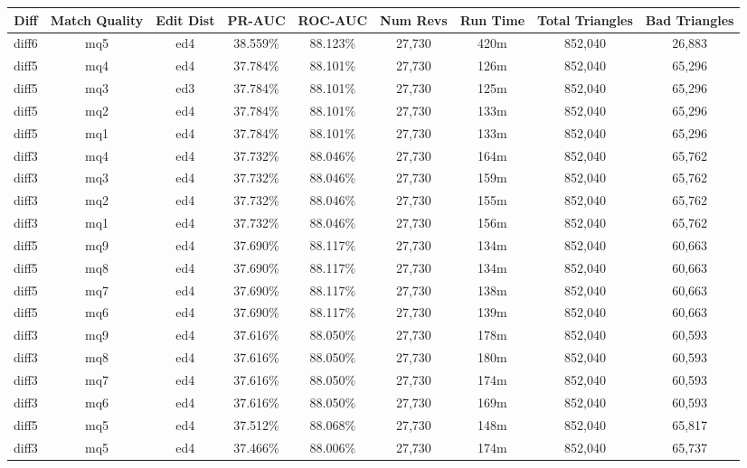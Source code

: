 \begin{sidewaystable}[!ph]
  \begin{center}
    \begin{tabular}{|c|c|c||c|c||c|c|c|c|}
\hline
Diff & Match Quality & Edit Dist
        & PR-AUC & ROC-AUC
        & Num Revs & Run Time
        & Total Triangles & Bad Triangles \\
\hline
\hline
diff6 & mq5 & ed4 & 38.559\% & 88.123\% & 27,730 & 420m & 852,040 & 26,883 \\
diff5 & mq4 & ed4 & 37.784\% & 88.101\% & 27,730 & 126m & 852,040 & 65,296 \\
diff5 & mq3 & ed3 & 37.784\% & 88.101\% & 27,730 & 125m & 852,040 & 65,296 \\
diff5 & mq2 & ed4 & 37.784\% & 88.101\% & 27,730 & 133m & 852,040 & 65,296 \\
diff5 & mq1 & ed4 & 37.784\% & 88.101\% & 27,730 & 133m & 852,040 & 65,296 \\
diff3 & mq4 & ed4 & 37.732\% & 88.046\% & 27,730 & 164m & 852,040 & 65,762 \\
diff3 & mq3 & ed4 & 37.732\% & 88.046\% & 27,730 & 159m & 852,040 & 65,762 \\
diff3 & mq2 & ed4 & 37.732\% & 88.046\% & 27,730 & 155m & 852,040 & 65,762 \\
diff3 & mq1 & ed4 & 37.732\% & 88.046\% & 27,730 & 156m & 852,040 & 65,762 \\
diff5 & mq9 & ed4 & 37.690\% & 88.117\% & 27,730 & 134m & 852,040 & 60,663 \\
diff5 & mq8 & ed4 & 37.690\% & 88.117\% & 27,730 & 134m & 852,040 & 60,663 \\
diff5 & mq7 & ed4 & 37.690\% & 88.117\% & 27,730 & 138m & 852,040 & 60,663 \\
diff5 & mq6 & ed4 & 37.690\% & 88.117\% & 27,730 & 139m & 852,040 & 60,663 \\
diff3 & mq9 & ed4 & 37.616\% & 88.050\% & 27,730 & 178m & 852,040 & 60,593 \\
diff3 & mq8 & ed4 & 37.616\% & 88.050\% & 27,730 & 180m & 852,040 & 60,593 \\
diff3 & mq7 & ed4 & 37.616\% & 88.050\% & 27,730 & 174m & 852,040 & 60,593 \\
diff3 & mq6 & ed4 & 37.616\% & 88.050\% & 27,730 & 169m & 852,040 & 60,593 \\
diff5 & mq5 & ed4 & 37.512\% & 88.068\% & 27,730 & 148m & 852,040 & 65,817 \\
diff3 & mq5 & ed4 & 37.466\% & 88.006\% & 27,730 & 174m & 852,040 & 65,737 \\

\end{tabular}
\end{center}
\end{sidewaystable}
